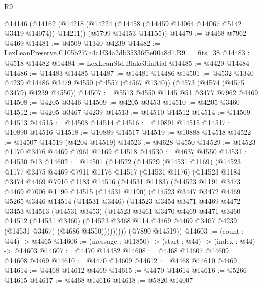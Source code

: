 \begin{lexlean}{R9}
\begin{coremodule}
  @14146
    (@14162
      (@14218 (@14224 (@14458 (@14459 @14064 @14067 @5142 @3419 @14074)) @14211))
      (@5799 @14153 @14155))
@14479 := @4468 @7962 @4469
@14481 := @4509 @1340 @4239
@14482 := LexLeanPreserve.C105b277a4c1f34a2db35336f5e00a8d1.R9.__fits_38
@14483 := @4518 @14482
@14484 := LexLeanStd.Blake3.initial
@14485 := @4420 @14484
@14486 := @14483 @14485
@14487 := @14481 @14486
@14501 := @4532
    @1340
    @4239
    @14486
    @3479
    @4550
    (@4557 (@4567 @1340))
    (@4573 (@4574 (@4575 @3479) @4239 @4550))
@14507 := @5513 @4550 @1145 @51 @3477 @7962 @4469
@14508 := @4205 @3446
@14509 := @4205 @3453
@14510 := @4205 @3460
@14512 := @4205 @3467 @4239
@14513 := @14510 @14512
@14514 := @14509 @14513
@14515 := @14508 @14514
@14516 := @10891 @14515
@14517 := @10890 @14516
@14518 := @10889 @14517
@14519 := @10888 @14518
@14522 := @14507 @14519 (@4204 @14519)
@14523 := @4628 @4550
@14529 := @14523 @1170 @3476 @4469 @7961 @1169 @14518
@14530 := @4637 @4550
@14531 := @14530 @13
@14602 := @14501
    (@14522
      (@14529
        (@14531 @1169)
        (@14523
          @1177
          @3475
          @4469
          @7911
          @1176
          @14517
          (@14531 @1176)
          (@14523
            @1184
            @3474
            @4469
            @7910
            @1183
            @14516
            (@14531 @1183)
            (@14523
              @1191
              @3473
              @4469
              @7006
              @1190
              @14515
              (@14531 @1190)
              (@14523
                @3447
                @3472
                @4469
                @5265
                @3446
                @14514
                (@14531 @3446)
                (@14523
                  @3454
                  @3471
                  @4469
                  @4472
                  @3453
                  @14513
                  (@14531 @3453)
                  (@14523
                    @3461
                    @3470
                    @4469
                    @4471
                    @3460
                    @14512
                    (@14531 @3460)
                    (@14523 @3468 @114 @4469 @4469 @3467 @4239 (@14531 @3467) (@4686 @4550)))))))))
      (@7890 @14519))
@14603 := (count : @44) -> @4465
@14606 := (message : @11850) -> (start : @44) -> (index : @44) -> @14603
@14607 := @4470 @14482
@14608 := @4468 @14607
@14609 := @14608 @4469
@14610 := @4470 @14609
@14612 := @4468 @14610 @4469
@14614 := @4468 @14612 @4469
@14615 := @4470 @14614
@14616 := @5266 @14615
@14617 := @4468 @14616
@14618 := @5820 @14007

\end{coremodule}
\end{lexlean}
